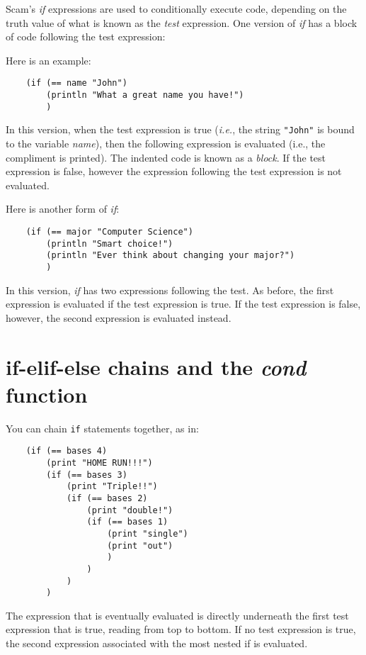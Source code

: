 Scam's {\it if} expressions are used to conditionally execute code,
depending on the truth value of what is known as the
{\it test} expression. One version of {\it if} has a block of
code following the test expression:

Here is an example:

\begin{verbatim}
    (if (== name "John")
        (println "What a great name you have!")
        )
\end{verbatim}

In this version, when the test expression is true ({\it i.e.}, 
the string {\tt "John"} is bound to the variable {\it name}), 
then the following expression is evaluated 
(i.e., the compliment
is printed). The indented code is known as a {\it block}.
If the test expression is false, however the
expression following the test expression is not evaluated.

Here is another form of {\it if}:

\begin{verbatim}
    (if (== major "Computer Science")
        (println "Smart choice!")
        (println "Ever think about changing your major?")
        )
\end{verbatim}

In this version, {\it if} has two expressions following
the test.
As before, the first expression is evaluated if the test expression
is true. If the test expression is false, however,
the second expression is evaluated instead.

\section{if-elif-else chains and the {\it cond} function}

You can chain {\tt if} statements together, as in:

\begin{verbatim}
    (if (== bases 4)
        (print "HOME RUN!!!")
        (if (== bases 3)
            (print "Triple!!")
            (if (== bases 2)
                (print "double!")
                (if (== bases 1) 
                    (print "single")
                    (print "out")
                    )
                )
            )
        )
\end{verbatim}

The expression that is eventually evaluated is
directly underneath the first test expression
that is true, reading from top to bottom.
If no test expression is true, the second expression associated
with the most nested if is evaluated.

